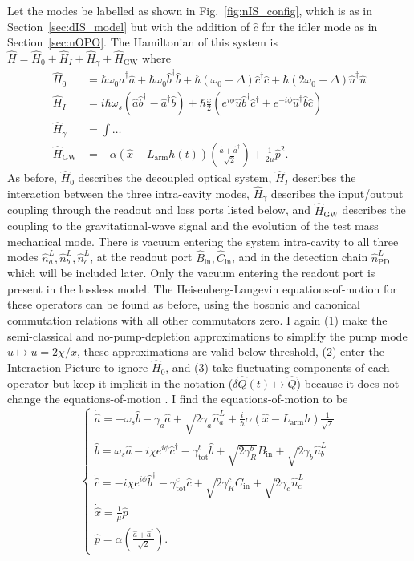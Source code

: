 Let the modes be labelled as shown in Fig.~\ref{fig:nIS_config}, which is as in Section~\ref{sec:dIS_model} but with the addition of $\hat c$ for the idler mode as in Section~\ref{sec:nOPO}. The Hamiltonian of this system is $\hat H = \hat H_0 + \hat H_I + \hat H_\gamma + \hat H_\text{GW}$ where~\cite{} 
\begin{align}
\hat H_0 &= \hbar \omega_0 \hat a^\dag \hat a + \hbar \omega_0 \hat b^\dag \hat b+ \hbar (\omega_0+\Delta) \hat c^\dag \hat c + \hbar (2\omega_0+\Delta) \hat u^\dag \hat u\\
\hat H_I &= i\hbar\omega_s(\hat a\hat b^\dag-\hat a^\dag\hat b) + \hbar \frac{x}{2} (e^{i\phi} \hat u \hat b^\dag \hat c^\dag+e^{-i\phi} \hat u^\dag \hat b \hat c) \\
\hat H_\gamma &= \int \ldots \\
\hat H_\text{GW} &= -\alpha (\hat{x}-L_\mathrm{arm}h(t))\left(\frac{\hat{a}+\hat{a}^\dag}{\sqrt{2}}\right)+\frac{1}{2\mu}\hat{p}^2.
\end{align}
As before, $\hat H_0$ describes the decoupled optical system, $\hat H_I$ describes the interaction between the three intra-cavity modes, $\hat H_\gamma$ describes the input/output coupling through the readout and loss ports listed below, and $\hat H_\text{GW}$ describes the coupling to the gravitational-wave signal and the evolution of the test mass mechanical mode.
There is vacuum entering the system intra-cavity to all three modes $\hat n^L_a, \hat n^L_b, \hat n^L_c$, at the readout port $\hat B_\text{in}, \hat C_\text{in}$, and in the detection chain $\hat n^L_\text{PD}$ which will be included later. Only the vacuum entering the readout port is present in the lossless model.
The Heisenberg-Langevin equations-of-motion for these operators can be found as before, using the bosonic and canonical commutation relations with all other commutators zero. I again (1) make the semi-classical and no-pump-depletion approximations to simplify the pump mode $\hat u\mapsto u=2\chi/x$, these approximations are valid below threshold, (2) enter the Interaction Picture to ignore $\hat H_0$, and (3) take fluctuating components of each operator but keep it implicit in the notation ($\delta\hat{Q}(t)\mapsto\hat{Q}$) because it does not change the equations-of-motion . I find the equations-of-motion to be
\begin{equation}\label{eq:nIS_EoM}
\begin{cases}
\dot{\hat{a}}=-\omega_s\hat{b} - \gamma_a \hat{a} + \sqrt{2\gamma_a}\hat{n}^L_a+\frac{i}{\hbar}\alpha(\hat{x}-L_\mathrm{arm}h)\frac{1}{\sqrt{2}}\\
\dot{\hat{b}}=\omega_s\hat{a} - i\chi e^{i\phi}\hat{c}^\dagger - \gamma^b_\mathrm{tot} \hat{b} + \sqrt{2\gamma^b_R}\hat{B}_\mathrm{in} + \sqrt{2\gamma_b}\hat{n}^L_b\\
\dot{\hat{c}}=-i\chi e^{i\phi}\hat{b}^\dagger - \gamma^c_\mathrm{tot} \hat{c} + \sqrt{2\gamma^c_R}\hat{C}_\mathrm{in} + \sqrt{2\gamma_c}\hat{n}^L_c\\
\dot{\hat{x}}=\frac{1}{\mu}\hat{p}\\
\dot{\hat{p}}=\alpha\left(\frac{\hat{a}+\hat{a}^\dag}{\sqrt{2}}\right).
\end{cases}
\end{equation}
